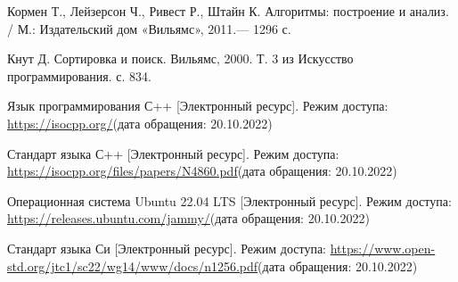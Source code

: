 
\renewcommand{\bibname}{Список использованных источников}
\begin{thebibliography}{10}
	Кормен Т., Лейзерсон Ч., Ривест Р., Штайн К. Алгоритмы: построение и анализ. / М.: Издательский дом «Вильямс», 2011.— 1296 с.
	
	Кнут Д. Сортировка и поиск. Вильямс, 2000. Т. 3 из Искусство программирования. с. 834.
	
	Язык программирования С++ [Электронный ресурс]. Режим доступа: 
	\url{https://isocpp.org/}(дата обращения: 20.10.2022)
	
	Стандарт языка С++ [Электронный ресурс]. Режим доступа:
	\url{https://isocpp.org/files/papers/N4860.pdf}(дата обращения: 20.10.2022) 
	
	Операционная система Ubuntu 22.04 LTS [Электронный ресурс]. Режим доступа: 
	\url{https://releases.ubuntu.com/jammy/}(дата обращения: 20.10.2022)
	
	Стандарт языка Си [Электронный ресурс]. Режим доступа: 
	\url{https://www.open-std.org/jtc1/sc22/wg14/www/docs/n1256.pdf}(дата обращения: 20.10.2022) 
	
	
	
\end{thebibliography}





